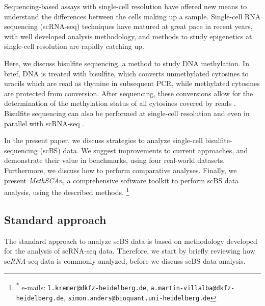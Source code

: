 \documentclass[10pt]{article}
\newcommand\blfootnote[1]{%
    \begingroup
    \renewcommand\thefootnote{}\footnote{#1}%
    \addtocounter{footnote}{-1}%
    \endgroup
}
\begin{document}
Sequencing-based assays with single-cell resolution have offered new means to understand the differences between the cells making up a sample.
Single-cell RNA sequencing (scRNA-seq) techniques have matured at great pace in recent years, with well developed analysis methodology, and methods to study epigenetics at single-cell resolution are rapidly catching up.


Here, we discuss bisulfite sequencing, a method to study DNA methylation.
In brief, DNA is treated with bisulfite, which converts unmethylated cytosines to uracils which are read as thymine in subsequent PCR, while methylated cytosines are protected from conversion.
After sequencing, these conversions allow for the determination of the methylation status of all cytosines covered by reads \citep{Frommer_1992}.
Bisulfite sequencing can also be performed at single-cell resolution \citep{Smallwood_2014} and even in parallel with scRNA-seq \citep{scMTseq,Clark2018}.

In the present paper, we discuss strategies to analyze single-cell bisulfite-sequencing (scBS) data.
We suggest improvements to current approaches, and demonstrate their value in benchmarks, using four real-world datasets.
Furthermore, we discuss how to perform comparative analyses.
Finally, we present \textit{MethSCAn}, a comprehensive software toolkit to perform scBS data analysis, using the described methods.
\blfootnote{\hspace{-.5cm}\raggedright\textsuperscript{*} e-mails:  \texttt{l.kremer@dkfz-heidelberg.de}, \hspace{1cm}\texttt{a.martin-villalba@dkfz-heidelberg.de}, \hspace{1cm}\texttt{simon.anders@bioquant.uni-heidelberg.de}}

\subsection*{Standard approach}

The standard approach to analyze scBS data is based on methodology developed for the analysis of scRNA-seq data.
Therefore, we start by briefly reviewing how sc\emph{RNA}-seq data is commonly analyzed, before we discuss scBS data analysis.
\end{document}
